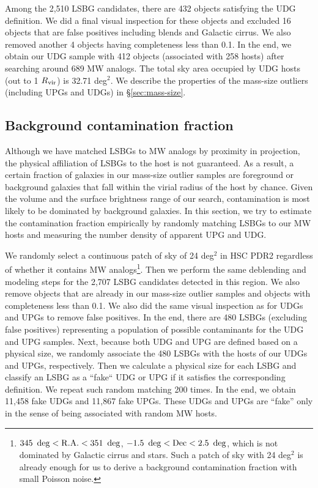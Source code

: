 \documentclass[twocolumn,astrosymb,twocolappendix]{aastex631}
\begin{document}
\begin{CJK*}{UTF8}{gbsn}
Among the 2,510 LSBG candidates, there are 432 objects satisfying the UDG definition. We did a final visual inspection for these objects and excluded 16 objects that are false positives including blends and Galactic cirrus. We also removed another 4 objects having completeness less than 0.1. In the end, we obtain our UDG sample with 412 objects (associated with 258 hosts) after searching around 689 MW analogs. The total sky area occupied by UDG hosts (out to 1 $R_{\rm{vir}}$) is 32.71 deg$^{2}$. We describe the properties of the mass-size outliers (including UPGs and UDGs) in \S\ref{sec:mass-size}.

\subsection{Background contamination fraction}\label{sec:bkg}
Although we have matched LSBGs to MW analogs by proximity in projection, the physical affiliation of LSBGs to the host is not guaranteed. As a result, a certain fraction of galaxies in our mass-size outlier samples are foreground or background galaxies that fall within the virial radius of the host by chance. Given the volume and the surface brightness range of our search, contamination is most likely to be dominated by background galaxies. In this section, we try to estimate the contamination fraction empirically by randomly matching LSBGs to our MW hosts and measuring the number density of apparent UPG and UDG.

We randomly select a continuous patch of sky of 24 deg$^{2}$ in HSC PDR2 regardless of whether it contains MW analogs\footnote{$345\ \deg < \rm{R.A.} < 351\ \deg$, $-1.5\ \deg < \rm{Dec} < 2.5\ \deg$, which is not dominated by Galactic cirrus and stars. Such a patch of sky with 24 deg$^2$ is already enough for us to derive a background contamination fraction with small Poisson noise.}. Then we perform the same deblending and modeling steps for the 2,707 LSBG candidates detected in this region. We also remove objects that are already in our mass-size outlier samples and objects with completeness less than 0.1. We also did the same visual inspection as for UDGs and UPGs to remove false positives. In the end, there are 480 LSBGs (excluding false positives) representing a population of possible contaminants for the UDG and UPG samples. Next, because both UDG and UPG are defined based on a physical size, we randomly associate the 480 LSBGs with the hosts of our UDGs and UPGs, respectively. Then we calculate a physical size for each LSBG and classify an LSBG as a ``fake`` UDG or UPG if it satisfies the corresponding definition. We repeat such random matching 200 times. In the end, we obtain 11,458 fake UDGs and 11,867 fake UPGs. These UDGs and UPGs are ``fake'' only in the sense of being associated with random MW hosts. 


\end{CJK*}
\end{document}
